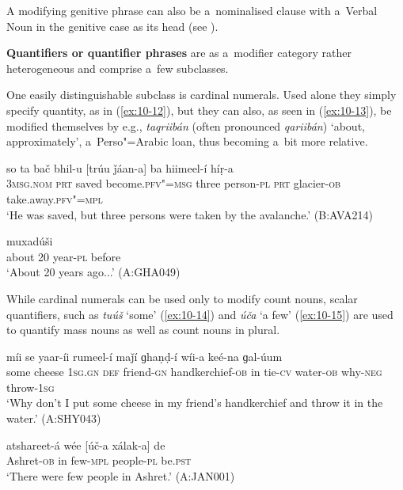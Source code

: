 A modifying genitive phrase can also be a~nominalised clause with a~Verbal Noun in the genitive case as its head (see ).


\textbf{Quantifiers or quantifier phrases} are as a~modifier category rather heterogeneous and comprise a~few subclasses.  


One easily distinguishable subclass is cardinal numerals. Used alone they simply specify quantity, as in (\ref{ex:10-12}), but they can also, as seen in (\ref{ex:10-13}), be modified themselves by e.g., \textit{taqriibán} (often pronounced \textit{qariibán}) `about, approximately', a~Perso"=Arabic loan, thus becoming a~bit more relative.

\begin{exe}
\ex
\label{ex:10-12}
\gll so ta bač bhil-u [trúu ǰáan-a] ba hiimeel-í híṛ-a  \\
\textsc{3msg.nom} \textsc{prt} saved become.\textsc{pfv"=msg} three  person-\textsc{pl} \textsc{prt} glacier-\textsc{ob} take.away.\textsc{pfv"=mpl} \\
\glt `He was saved, but three persons were taken by the avalanche.' (B:AVA214)

\ex
\label{ex:10-13}
 muxadúši  \\
about 20 year-\textsc{pl} before \\
\glt `About 20 years ago...' (A:GHA049)
\end{exe}

While cardinal numerals can be used only to modify count nouns, scalar quantifiers, such as \textit{tuúš} `some' (\ref{ex:10-14}) and \textit{úča} `a few' (\ref{ex:10-15}) are used to quantify mass nouns as well as count nouns in plural. 

\begin{exe}
\ex
\label{ex:10-14}
 míi se yaar-íi rumeel-í maǰí ɡhaṇḍ-í wíi-a keé-na ɡal-úum \\
some cheese \textsc{1sg.gn} \textsc{def} friend-\textsc{gn} handkerchief-\textsc{ob}  in tie-\textsc{cv} water-\textsc{ob} why-\textsc{neg} throw-\textsc{1sg} \\
\glt `Why don't I put some cheese in my friend's handkerchief and throw it in the water.' (A:SHY043)

\ex
\label{ex:10-15}
\gll atshareet-á wée [úč-a xálak-a] de \\
Ashret-\textsc{ob} in few-\textsc{mpl} people-\textsc{pl} be.\textsc{pst} \\
\glt `There were few people in Ashret.' (A:JAN001)
\end{exe}

